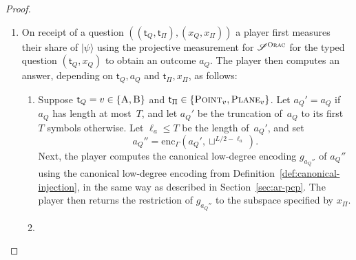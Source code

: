 \documentclass[11pt]{article}
\theoremstyle{definition}
\newcommand{\ket}[1]{|#1\rangle}
\newcommand{\decider}{\mathcal{D}}
\newcommand{\strategy}{\mathscr{S}}
\newcommand{\gamestyle}[1]{\ensuremath{\textsc{#1}}\xspace}
\newcommand{\ora}{\gamestyle{Orac}}
\newcommand{\labelstyle}[1]{\ensuremath{\textsc{#1}}\xspace}
\newcommand{\tvarstyle}[1]{\mathsf{#1}}
\newcommand{\tvar}{\ensuremath{\tvarstyle{t}}}
\newcommand{\alice}{\labelstyle{A}}
\newcommand{\bob}{\labelstyle{B}}
\newcommand{\oracle}{\labelstyle{Oracle}}
\newcommand{\typestyle}[1]{\ensuremath{\textsc{#1}}\xspace}
\newcommand{\Plane}{\typestyle{Plane}}
\newcommand{\Point}{\typestyle{Point}}
\begin{document}
\begin{proof}
  \begin{enumerate}
  \item On receipt of a question $((\tvar_Q,\tvar_\Pi),(x_Q, x_\Pi))$ a player
    first measures their share of $\ket{\psi}$ using the projective measurement
    for $\strategy^\ora$ for the typed question $(\tvar_Q,x_Q)$ to obtain an
    outcome $a_Q$.
    The player then computes an answer, depending on $\tvar_Q, a_Q$ and
    $\tvar_\Pi,x_\Pi$, as follows:
    \begin{enumerate}
    \item Suppose $\tvar_Q = v \in \{\alice,\bob\}$ and $\tvar_\Pi \in
      \{\Point_v, \Plane_v \}$.
      Let $a_Q' = a_Q$ if $a_Q$ has length at most~$T$, and let $a_Q'$ be the
      truncation of~$a_Q$ to its first~$T$ symbols otherwise.
      Let $\ell_a \leq T$ be the length of~$a_Q'$, and set
      \begin{equation*}
      a_Q'' = \mathrm{enc}_\Gamma(a_Q', \sqcup^{L/2 - \ell_a}).
      \end{equation*}
      Next, the player computes the canonical low-degree encoding $g_{a_Q''}$ of
      $a_Q''$ using the canonical low-degree encoding from
      Definition~\ref{def:canonical-injection}, in the same way as described in
      Section~\ref{sec:ar-pcp}.
      The player then returns the restriction of $g_{a_Q''}$ to the subspace
      specified by $x_\Pi$.
    \item

\end{enumerate}
\end{enumerate}
\end{proof}
\end{document}
